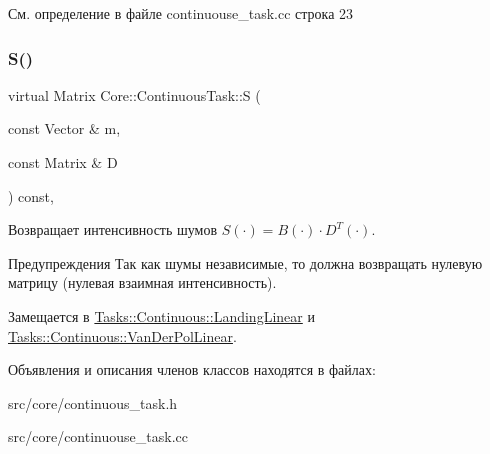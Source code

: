 См. определение в файле continuouse\+\_\+task.\+cc строка 23

\hypertarget{class_core_1_1_continuous_task_aa6d652b655628586aeeda03348f633c5}{}\label{class_core_1_1_continuous_task_aa6d652b655628586aeeda03348f633c5} 
\subsubsection{\texorpdfstring{S()}{S()}}
{\footnotesize\ttfamily virtual Matrix Core\+::\+Continuous\+Task\+::S (\begin{DoxyParamCaption}\item[{const Vector \&}]{m,  }\item[{const Matrix \&}]{D }\end{DoxyParamCaption}) const\hspace{0.3cm}{\ttfamily [protected]}, {}}



Возвращает интенсивность шумов $S(\cdot) = B(\cdot) \cdot D^T(\cdot)$. 

\begin{DoxyWarning}{Предупреждения}
Так как шумы независимые, то должна возвращать нулевую матрицу (нулевая взаимная интенсивность). 
\end{DoxyWarning}


Замещается в \hyperlink{class_tasks_1_1_continuous_1_1_landing_linear_a886bc6dd08e4355ab0c491d48f9de002}{Tasks\+::\+Continuous\+::\+Landing\+Linear} и \hyperlink{class_tasks_1_1_continuous_1_1_van_der_pol_linear_aa6cb67403faa3c2f894988aead527234}{Tasks\+::\+Continuous\+::\+Van\+Der\+Pol\+Linear}.



Объявления и описания членов классов находятся в файлах\+:\begin{DoxyCompactItemize}
\item 
src/core/continuous\+\_\+task.\+h\item 
src/core/continuouse\+\_\+task.\+cc\end{DoxyCompactItemize}
